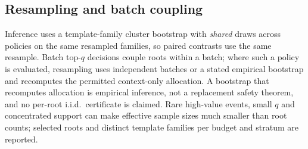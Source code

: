 \subsection{Resampling and batch coupling}

Inference uses a template-family cluster bootstrap with \emph{shared} draws across
policies on the same resampled families, so paired contrasts use the same
resample.  Batch top-$q$ decisions couple roots within a batch; where such a
policy is evaluated, resampling uses independent batches or a stated empirical
bootstrap and recomputes the permitted context-only allocation.  A bootstrap that
recomputes allocation is empirical inference, not a replacement safety theorem,
and no per-root i.i.d.\ certificate is claimed.  Rare high-value events, small
$q$ and concentrated support can make effective sample sizes much smaller than
root counts; selected roots and distinct template families per budget and
stratum are reported.
